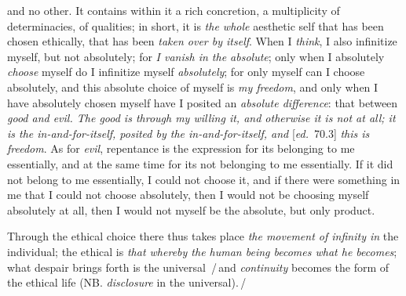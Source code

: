\documentclass[12pt,a4paper,openany]{book}
\newcommand{\ed}[1]{{\small[\textit{ed.}\ #1]}}
\newcommand{\ins}[1]{\,/\,#1\,/\,}
\begin{document}
and no other. It contains within it a rich concretion, a
multiplicity of determinacies, of qualities; in short, it is \emph{the whole}
aesthetic self that has been chosen ethically, that has been \emph{taken over by itself}. When I
\emph{think}, I also infinitize myself, but not absolutely; for \emph{I
vanish in the absolute}; only when I absolutely \emph{choose} myself do I infinitize
myself \emph{absolutely}; for only myself can I choose absolutely, and
this absolute choice of myself is \emph{my freedom}, and only when I have absolutely
chosen myself have I posited an \emph{absolute difference}: that between \emph{good
and evil. The good is through my willing it, and otherwise it is not at all; it is the in-and-for-itself,
posited by the in-and-for-itself, and} \ed{70.3} \emph{this is freedom}. As
for \emph{evil}, repentance is the expression for its belonging to me
essentially, and at the same time for its not belonging to me essentially. If
it did not belong to me essentially, I could not choose it, and if there were
something in me that I could not choose absolutely, then I would not be choosing
myself absolutely at all, then I would not myself be the absolute,
but only product.

Through the ethical choice there thus takes place \emph{the movement of infinity in} the individual;
the ethical is \emph{that whereby the human being becomes what he becomes}; what
despair brings forth is the universal \ins{and \emph{continuity}
becomes the form of the ethical life (NB. \emph{disclosure} in the universal).}
\end{document}
